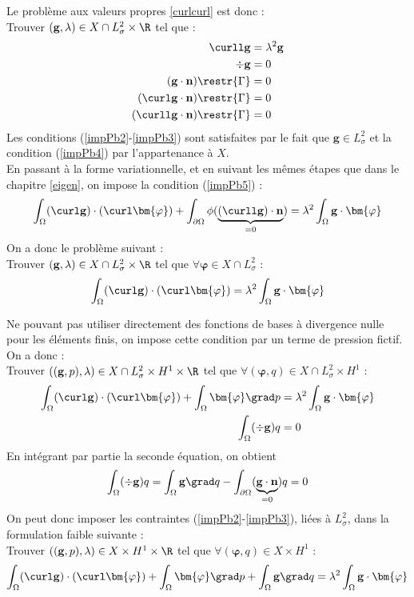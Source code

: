 Le problème aux valeurs propres \ref{curlcurl} est donc :\\
Trouver $(\mathbf{g},\lambda)\in X\cap L^2_\sigma\times\R$ tel que :
\begin{align}
\curll\mathbf{g}&=\lambda^2\mathbf{g} \label{impPb1}\\
\div\mathbf{g}&=0 \label{impPb2}\\
(\mathbf{g}\cdot\mathbf{n})\restr{\Gamma}&=0 \label{impPb3}\\
(\curl\mathbf{g}\cdot\mathbf{n})\restr{\Gamma}&=0 \label{impPb4}\\
(\curll\mathbf{g}\cdot\mathbf{n})\restr{\Gamma}&=0 \label{impPb5}
\end{align}
Les conditions (\ref{impPb2}-\ref{impPb3}) sont satisfaites par le fait que $\mathbf{g}\in L^2_\sigma$ et la condition (\ref{impPb4}) par l'appartenance à $X$.\\

En passant à la forme variationnelle, et en suivant les mêmes étapes que dans le chapitre \ref{eigen}, on impose la condition (\ref{impPb5}) :
\[ \int_\Omega (\curl\mathbf{g})\cdot(\curl\bm{\varphi}) + \int_{\partial\Omega} \phi(\underbrace{(\curll \mathbf{g})\cdot\mathbf{n}}_{=0})= \lambda^2\int_\Omega \mathbf{g}\cdot\bm{\varphi} \]
On a donc le problème suivant :\\
Trouver $(\mathbf{g},\lambda)\in X\cap L^2_\sigma\times\R$ tel que $\forall \bm{\varphi}\in X\cap L^2_\sigma$ :
\[ \int_\Omega (\curl\mathbf{g})\cdot(\curl\bm{\varphi}) = \lambda^2\int_\Omega \mathbf{g}\cdot\bm{\varphi} \]

Ne pouvant pas utiliser directement des fonctions de bases à divergence nulle pour les éléments finis, on impose cette condition par un terme de pression fictif. On a donc :\\
Trouver $((\mathbf{g},p),\lambda)\in X\cap L^2_\sigma \times H^1 \times \R$ tel que $\forall (\bm{\varphi},q)\in X\cap L^2_\sigma \times H^1$ :
\begin{align*}
\int_\Omega (\curl\mathbf{g})\cdot(\curl\bm{\varphi}) + \int_\Omega\bm{\varphi}\grad p &= \lambda^2\int_\Omega \mathbf{g}\cdot\bm{\varphi}\\
\int_\Omega (\div\mathbf{g}) q &= 0
\end{align*}
En intégrant par partie la seconde équation, on obtient
\[ \int_\Omega (\div\mathbf{g}) q = \int_\Omega \mathbf{g}\grad q - \int_{\partial\Omega} (\underbrace{\mathbf{g}\cdot \mathbf{n}}_{=0})q = 0 \]
On peut donc imposer les contraintes (\ref{impPb2}-\ref{impPb3}), liées à $L^2_\sigma$, dans la formulation faible suivante :\\
Trouver $((\mathbf{g},p),\lambda)\in X \times H^1 \times \R$ tel que $\forall (\bm{\varphi},q)\in X \times H^1$ :
\[ \int_\Omega (\curl\mathbf{g})\cdot(\curl\bm{\varphi}) + \int_\Omega\bm{\varphi}\grad p + \int_\Omega \mathbf{g}\grad q = \lambda^2\int_\Omega \mathbf{g}\cdot\bm{\varphi} \]

